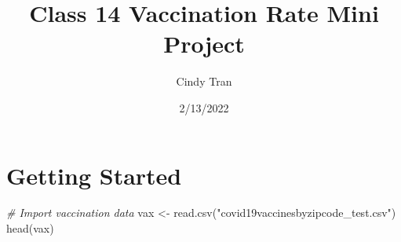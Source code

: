 \documentclass[
]{article}
\title{Class 14 Vaccination Rate Mini Project}
\author{Cindy Tran}
\date{2/13/2022}
\newenvironment{Shaded}{\begin{snugshade}}{\end{snugshade}}
\newcommand{\CommentTok}[1]{\textcolor[rgb]{0.56,0.35,0.01}{\textit{#1}}}
\newcommand{\FunctionTok}[1]{\textcolor[rgb]{0.00,0.00,0.00}{#1}}
\newcommand{\NormalTok}[1]{#1}
\newcommand{\OtherTok}[1]{\textcolor[rgb]{0.56,0.35,0.01}{#1}}
\newcommand{\StringTok}[1]{\textcolor[rgb]{0.31,0.60,0.02}{#1}}
\begin{document}
\maketitle

\hypertarget{getting-started}{%
\section{Getting Started}\label{getting-started}}

\begin{Shaded}
\begin{Highlighting}[]
\CommentTok{\# Import vaccination data}
\NormalTok{vax }\OtherTok{\textless{}{-}} \FunctionTok{read.csv}\NormalTok{(}\StringTok{"covid19vaccinesbyzipcode\_test.csv"}\NormalTok{)}
\FunctionTok{head}\NormalTok{(vax)}
\end{Highlighting}
\end{Shaded}
\end{document}
